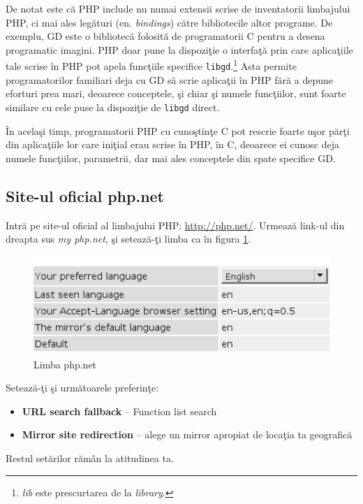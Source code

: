 De notat este că PHP include nu numai extensii scrise
de inventatorii limbajului PHP, ci mai ales legături
(en. \textsl{bindings})
către bibliotecile altor programe. De exemplu,
GD este o bibliotecă folosită de programatorii C
pentru a desena programatic imagini. PHP doar
pune la dispoziţie o interfaţă prin care aplicaţiile
tale scrise în PHP pot apela funcţiile specifice \texttt{libgd}.\footnote{\textit{lib}
este prescurtarea de la \textit{library}.}
Asta permite programatorilor familiari deja cu GD
să scrie aplicaţii în PHP fără a depune eforturi
prea mari, deoarece conceptele, şi chiar şi numele funcţiilor,
sunt foarte similare cu cele puse la dispoziţie de \texttt{libgd}
direct.

În acelaşi timp, programatorii PHP cu cunoştinţe C
pot rescrie foarte uşor părţi din aplicaţiile lor
care iniţial erau scrise în PHP, în C, deoarece
ei cunosc deja numele funcţiilor, parametrii,
dar mai ales conceptele din spate specifice 
GD.


\subsection{Site-ul oficial php.net}
Intră pe site-ul oficial al limbajului PHP: \url{http://php.net/}.
Urmează link-ul din dreapta sus \textit{my php.net}, şi setează-ţi
limba ca în figura \ref{fig:php.net lang}.

\begin{figure}[h!]
  \centering
    \includegraphics{cap03/language.png}
  \caption{Limba php.net}
  \label{fig:php.net lang}
\end{figure}
Setează-ţi şi următoarele preferinţe:
\begin{itemize}
\item \textbf{URL search fallback} -- Function list search
\item \textbf{Mirror site redirection} -- alege un mirror apropiat de locaţia ta geografică
\end{itemize}
Restul setărilor rămân la atitudinea ta.

